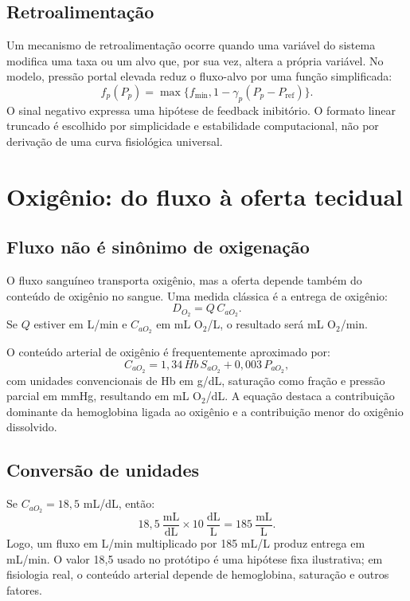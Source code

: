 \documentclass[11pt,a4paper,oneside]{book}
\newcommand{\Do}{D_{O_2}}
\begin{document}
\section{Retroalimentação}
Um mecanismo de retroalimentação ocorre quando uma variável do sistema modifica uma taxa ou um alvo que, por sua vez, altera a própria variável. No modelo, pressão portal elevada reduz o fluxo-alvo por uma função simplificada:
\begin{equation}
  f_p(P_p)=\max\{f_{\min},1-\gamma_p(P_p-P_{\mathrm{ref}})\}.
\end{equation}
O sinal negativo expressa uma hipótese de feedback inibitório. O formato linear truncado é escolhido por simplicidade e estabilidade computacional, não por derivação de uma curva fisiológica universal.

\chapter{Oxigênio: do fluxo à oferta tecidual}

\section{Fluxo não é sinônimo de oxigenação}
O fluxo sanguíneo transporta oxigênio, mas a oferta depende também do conteúdo de oxigênio no sangue. Uma medida clássica é a entrega de oxigênio:
\begin{equation}
  \Do=Q\,C_{aO_2}.
  \label{eq:oxygen-delivery}
\end{equation}
Se $Q$ estiver em L/min e $C_{aO_2}$ em mL O$_2$/L, o resultado será mL O$_2$/min.

O conteúdo arterial de oxigênio é frequentemente aproximado por:
\begin{equation}
  C_{aO_2}=1{,}34\,Hb\,S_{aO_2}+0{,}003\,P_{aO_2},
\end{equation}
com unidades convencionais de Hb em g/dL, saturação como fração e pressão parcial em mmHg, resultando em mL O$_2$/dL. A equação destaca a contribuição dominante da hemoglobina ligada ao oxigênio e a contribuição menor do oxigênio dissolvido.

\section{Conversão de unidades}
Se $C_{aO_2}=18{,}5$ mL/dL, então:
\begin{equation}
  18{,}5\ \frac{\mathrm{mL}}{\mathrm{dL}}
  \times 10\ \frac{\mathrm{dL}}{\mathrm{L}}
  =185\ \frac{\mathrm{mL}}{\mathrm{L}}.
\end{equation}
Logo, um fluxo em L/min multiplicado por 185 mL/L produz entrega em mL/min. O valor 18,5 usado no protótipo é uma hipótese fixa ilustrativa; em fisiologia real, o conteúdo arterial depende de hemoglobina, saturação e outros fatores.
\end{document}

